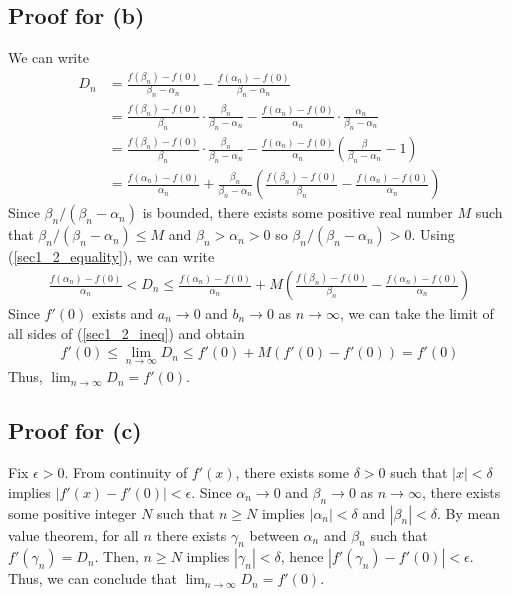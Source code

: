 \documentclass{scrartcl}
\begin{document}
\subsection{Proof for (b)}
We can write
\begin{align}
  \nonumber D_n
  &= \frac{f(\beta_n) - f(0)}{\beta_n - \alpha_n} - \frac{f(\alpha_n) - f(0)}{\beta_n - \alpha_n} \\
  \nonumber &= \frac{f(\beta_n) - f(0)}{\beta_n} \cdot \frac{\beta_n}{\beta_n - \alpha_n} - \frac{f(\alpha_n) - f(0)}{\alpha_n} \cdot \frac{\alpha_n}{\beta_n - \alpha_n} \\
  \nonumber &= \frac{f(\beta_n) - f(0)}{\beta_n} \cdot \frac{\beta_n}{\beta_n - \alpha_n} - \frac{f(\alpha_n) - f(0)}{\alpha_n} \left( \frac{\beta}{\beta_n - \alpha_n} - 1 \right) \\
  \label{sec1_2_equality} &= \frac{f(\alpha_n) - f(0)}{\alpha_n} + \frac{\beta_n}{\beta_n - \alpha_n} \left( \frac{f(\beta_n) - f(0)}{\beta_n} - \frac{f(\alpha_n) - f(0)}{\alpha_n} \right)
\end{align}
Since \(\beta_n / (\beta_n - \alpha_n)\) is bounded, there exists some positive real number \(M\) such that \(\beta_n / (\beta_n - \alpha_n) \leq M\) and \(\beta_n > \alpha_n > 0\) so \(\beta_n / (\beta_n - \alpha_n) > 0\).
Using (\ref{sec1_2_equality}), we can write
\begin{align}\label{sec1_2_ineq}
  \frac{f(\alpha_n) - f(0)}{\alpha_n}
  < D_n
  \leq \frac{f(\alpha_n) - f(0)}{\alpha_n} + M\left( \frac{f(\beta_n) - f(0)}{\beta_n} - \frac{f(\alpha_n) - f(0)}{\alpha_n} \right)
\end{align}
Since \(f'(0)\) exists and \(a_n \to 0\) and \(b_n \to 0\) as \(n \to \infty\), we can take the limit of all sides of (\ref{sec1_2_ineq}) and obtain
\begin{align*}
  f'(0) \leq \lim_{n \to \infty} D_n \leq f'(0) + M (f'(0) - f'(0)) = f'(0)
\end{align*}
Thus, \(\lim_{n \to \infty} D_n = f'(0)\).

\subsection{Proof for (c)}
Fix \(\epsilon > 0\).
From continuity of \(f'(x)\), there exists some \(\delta > 0\) such that \(|x| < \delta\) implies \(|f'(x) - f'(0)| < \epsilon\).
Since \(\alpha_n \to 0\) and \(\beta_n \to 0\) as \(n \to \infty\), there exists some positive integer \(N\) such that \(n \geq N\) implies \(|\alpha_n| < \delta\) and \(|\beta_n| < \delta\).
By mean value theorem, for all \(n\) there exists \(\gamma_n\) between \(\alpha_n\) and \(\beta_n\) such that \(f'(\gamma_n) = D_n\).
Then, \(n \geq N\) implies \(|\gamma_n| < \delta\), hence \(|f'(\gamma_n) - f'(0)| < \epsilon\).
Thus, we can conclude that \(\lim_{n \to \infty} D_n = f'(0)\).
\end{document}
